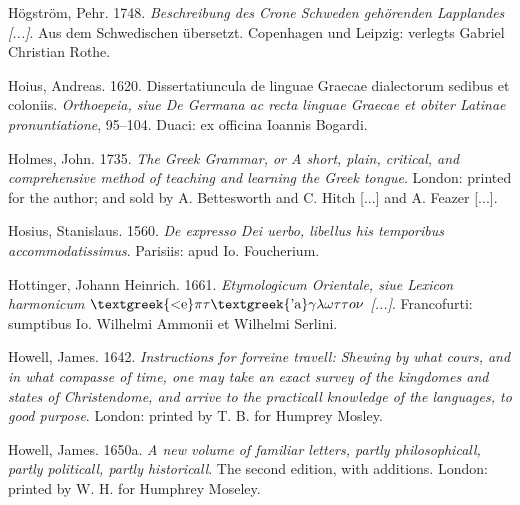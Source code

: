 \begin{styleStandard}
Högström, Pehr. 1748. \textit{Beschreibung des Crone Schweden gehörenden Lapplandes [...]}. Aus dem Schwedischen übersetzt. Copenhagen und Leipzig: verlegts Gabriel Christian Rothe.
\end{styleStandard}

\begin{styleStandard}
Hoius, Andreas. 1620. Dissertatiuncula de linguae Graecae dialectorum sedibus et coloniis. \textit{Orthoepeia, siue De Germana ac recta linguae Graecae et obiter Latinae pronuntiatione}, 95–104. Duaci: ex officina Ioannis Bogardi.
\end{styleStandard}

\begin{styleStandard}
Holmes, John. 1735. \textit{The Greek Grammar, or A short, plain, critical, and comprehensive method of teaching and learning the Greek tongue}. London: printed for the author; and sold by A. Bettesworth and C. Hitch [...] and A. Feazer [...].
\end{styleStandard}

\begin{styleStandard}
Hosius, Stanislaus. 1560. \textit{De expresso Dei uerbo, libellus his temporibus accommodatissimus}. Parisiis: apud Io. Foucherium.
\end{styleStandard}

\begin{styleStandard}
Hottinger, Johann Heinrich. 1661. \textit{Etymologicum Orientale, siue Lexicon harmonicum $\text{\textgreek{<e}}\pi \tau \text{\textgreek{'a}}\gamma \lambda \omega \tau \tau o\nu $ [...]}. Francofurti: sumptibus Io. Wilhelmi Ammonii et Wilhelmi Serlini.
\end{styleStandard}

\begin{styleStandard}
Howell, James. 1642. \textit{Instructions for forreine travell: Shewing by what cours, and in what compasse of time, one may take an exact survey of the kingdomes and states of Christendome, and arrive to the practicall knowledge of the languages, to good purpose}. London: printed by T. B. for Humprey Mosley.
\end{styleStandard}

\begin{styleStandard}
Howell, James. 1650a. \textit{A new volume of familiar letters, partly philosophicall, partly politicall, partly historicall}. The second edition, with additions. London: printed by W. H. for Humphrey Moseley.
\end{styleStandard}

